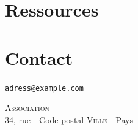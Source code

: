 \documentclass[12pt,nofoldmark,notumble]{leaflet}
\begin{document}
\vspace*{\fill}

\section{\faInfoCircle Ressources}

\begin{description}[align=right,labelwidth=4.2cm]

\item [Retouche photo] 

\item [Développement RAW] 

\item [PAO] 

\item [Logiciels] 

\item [Photo] 

\end{description}
   
\vspace*{\fill}

\section{\faEnvelope Contact}

\texttt{adress@example.com}
\vspace*{\fill}
\begin{center}
{ \textsc{Association} \\ 34,
  rue - Code postal \textsc{Ville} - Pays}

\end{center}
\end{document}
